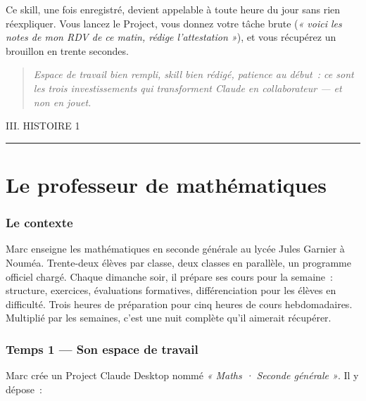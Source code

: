 \documentclass[11pt,a4paper]{article}
\newcommand{\dateline}[1]{{\footnotesize\ttfamily\color{encrefaint}\MakeUppercase{#1}}}
\newcommand{\bordsec}[1]{\subsubsection*{\textcolor{bordeaux}{#1}}}
\newcommand{\pullquote}[1]{%
  \begin{quote}\itshape\color{encre}\large #1\end{quote}%
}
\begin{document}
Ce skill, une fois enregistré, devient appelable à toute heure du jour
sans rien réexpliquer. Vous lancez le Project, vous donnez votre tâche
brute (\textit{« voici les notes de mon RDV de ce matin, rédige
l'attestation »}), et vous récupérez un brouillon en trente secondes.

\vspace{1cm}

\pullquote{Espace de travail bien rempli, skill bien rédigé, patience
au début~: ce sont les trois investissements qui transforment Claude
en collaborateur — et non en jouet.}

\newpage


\dateline{III. \quad Histoire 1}

\vspace{0.4cm}
{\color{encre}\rule{\linewidth}{0.4pt}}
\vspace{1cm}

\section*{Le professeur de mathématiques}

\subsubsection*{Le contexte}

Marc enseigne les mathématiques en seconde générale au lycée Jules Garnier
à Nouméa. Trente-deux élèves par classe, deux classes en parallèle, un
programme officiel chargé. Chaque dimanche soir, il prépare ses cours pour
la semaine~: structure, exercices, évaluations formatives, différenciation
pour les élèves en difficulté. Trois heures de préparation pour cinq heures
de cours hebdomadaires. Multiplié par les semaines, c'est une nuit complète
qu'il aimerait récupérer.

\bordsec{Temps 1 — Son espace de travail}

Marc crée un Project Claude Desktop nommé \textit{« Maths · Seconde
générale »}. Il y dépose~:
\end{document}
